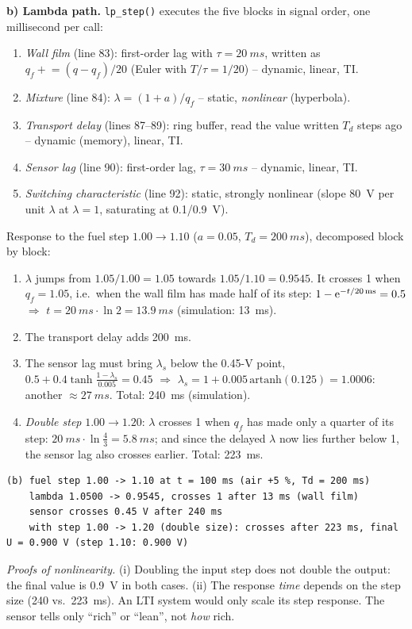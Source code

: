 \begin{solution}
\textbf{b) Lambda path.} \texttt{lp\_step()} executes the five blocks in
signal order, one millisecond per call:
\begin{enumerate}[label=Step \arabic*:,leftmargin=*,itemsep=1pt]
  \item \emph{Wall film} (line 83): first-order lag with $\tau=\SI{20}{ms}$,
    written as $q_f\mathrel{+}=(q-q_f)/20$ (Euler with $T/\tau=1/20$) --
    dynamic, linear, TI.
  \item \emph{Mixture} (line 84): $\lambda=(1+a)/q_f$ -- static,
    \emph{nonlinear} (hyperbola).
  \item \emph{Transport delay} (lines 87--89): ring buffer, read the value
    written $T_d$ steps ago -- dynamic (memory), linear, TI.
  \item \emph{Sensor lag} (line 90): first-order lag, $\tau=\SI{30}{ms}$ --
    dynamic, linear, TI.
  \item \emph{Switching characteristic} (line 92): static, strongly
    nonlinear (slope \SI{80}{V} per unit $\lambda$ at $\lambda=1$, saturating at
    0.1/\SI{0.9}{V}).
\end{enumerate}
Response to the fuel step $1.00\to1.10$ ($a=0.05$, $T_d=\SI{200}{ms}$),
decomposed block by block:
\begin{enumerate}[label=Step \arabic*:,leftmargin=*,itemsep=1pt,resume]
  \item $\lambda$ jumps from $1.05/1.00=1.05$ towards $1.05/1.10=0.9545$. It
    crosses 1 when $q_f=1.05$, i.e.\ when the wall film has made half of its
    step: $1-\mathrm{e}^{-t/20\,\text{ms}}=0.5$ $\Rightarrow$
    $t=\SI{20}{ms}\cdot\ln2=\SI{13.9}{ms}$ (simulation: \SI{13}{ms}).
  \item The transport delay adds \SI{200}{ms}.
  \item The sensor lag must bring $\lambda_s$ below the 0.45-V point,
    $0.5+0.4\tanh\frac{1-\lambda_s}{0.005}=0.45$ $\Rightarrow$
    $\lambda_s=1+0.005\,\mathrm{artanh}(0.125)=1.0006$: another
    $\approx\SI{27}{ms}$. Total: \SI{240}{ms} (simulation).
  \item \emph{Double step} $1.00\to1.20$: $\lambda$ crosses 1 when $q_f$ has
    made only a quarter of its step: $\SI{20}{ms}\cdot\ln\frac43=\SI{5.8}{ms}$;
    and since the delayed $\lambda$ now lies further below 1, the sensor lag
    also crosses earlier. Total: \SI{223}{ms}.
\end{enumerate}
\begin{lstlisting}[style=shell,numbers=none]
(b) fuel step 1.00 -> 1.10 at t = 100 ms (air +5 %, Td = 200 ms)
    lambda 1.0500 -> 0.9545, crosses 1 after 13 ms (wall film)
    sensor crosses 0.45 V after 240 ms
    with step 1.00 -> 1.20 (double size): crosses after 223 ms, final U = 0.900 V (step 1.10: 0.900 V)
\end{lstlisting}
\emph{Proofs of nonlinearity.} (i) Doubling the input step does not double the
output: the final value is \SI{0.9}{V} in both cases. (ii) The response
\emph{time} depends on the step size (240 vs.\ \SI{223}{ms}). An LTI system
would only scale its step response. The sensor tells only ``rich'' or
``lean'', not \emph{how} rich.


\end{solution}

